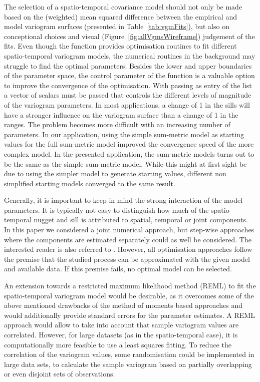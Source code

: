 The selection of a spatio-temporal covariance model should not only be made based on the (weighted) mean squared difference between the empirical and model variogram surfaces (presented in Table~\ref{tab:vgmFits}), but also on conceptional choices and visual (Figure~\ref{fig:allVgmsWireframe}) judgement of the fits. Even though the function  provides optimisation routines to fit different spatio-temporal variogram models, the numerical routines in the background may struggle to find the optimal parameters. Besides the lower and upper boundaries of the parameter space, the control parameter  of the  function is  a valuable option to improve the convergence of the optimisation. With passing  as entry of the list  a vector of scalars must be passed that controls the different levels of magnitude of the variogram parameters. In most applications, a change of 1 in the sills will have a stronger influence on the variogram surface than a change of 1 in the ranges. The problem becomes more difficult with an increasing number of parameters. In our application, using the simple sum-metric model as starting values for the full sum-metric model improved the convergence speed of the more complex model. In the presented application, the sum-metric models turns out to be the same as the simple sum-metric model. While this might at first sight be due to using the simpler model to generate starting values, different non simplified starting models converged to the same result. 

Generally, it is important to keep in mind the strong interaction of the model parameters. It is typically not easy to distinguish how much of the spatio-temporal nugget and sill is attributed to spatial, temporal or joint components. In this paper we considered a joint numerical approach, but step-wise approaches where the components are estimated separately could as well be considered. The interested reader is also referred to \cite{Nash2014}. However, all optimisation approaches follow the premise that the studied process can be approximated with the given model and available data. If this premise fails, no optimal model can be selected.

An extension towards a restricted maximum likelihood method (REML) to fit the spatio-temporal variogram model would be desirable, as it overcomes some of the above mentioned drawbacks of the method of moments based approaches and would additionally provide standard errors for the parameter estimates. A REML approach would allow to take into account that sample variogram values are correlated. However, for large datasets (as in the spatio-temporal case), it is computationally more feasible to use a least squares fitting. To reduce the correlation of the variogram values, some randomisation could be implemented in large data sets, to calculate the sample variogram based on partially overlapping or even disjoint sets of observations.

